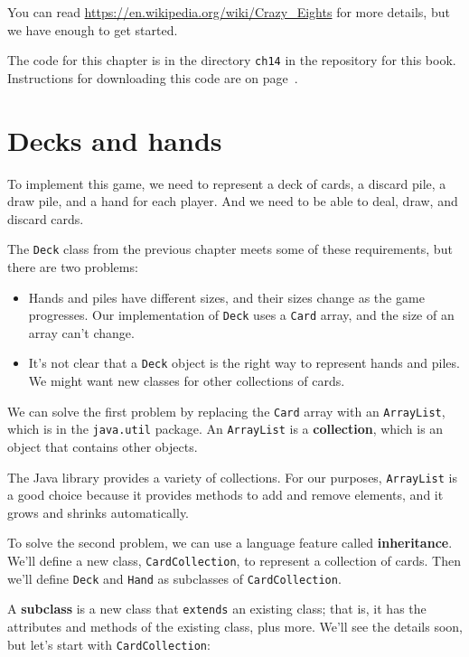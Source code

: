 \documentclass[12pt]{book}
\theoremstyle{exercise}
\newcommand{\java}[1]{\verb"#1"}
\begin{document}
You can read \url{https://en.wikipedia.org/wiki/Crazy_Eights} for more details, but we have enough to get started.

The code for this chapter is in the directory {\tt ch14} in the repository for this book.
Instructions for downloading this code are on page~\pageref{code}.


\section{Decks and hands}

To implement this game, we need to represent a deck of cards, a discard pile, a draw pile, and a hand for each player.
And we need to be able to deal, draw, and discard cards.

The \java{Deck} class from the previous chapter meets some of these requirements, but there are two problems:

\begin{itemize}

\item Hands and piles have different sizes, and their sizes change as the game progresses.
Our implementation of \java{Deck} uses a \java{Card} array, and the size of an array can't change.

\item It's not clear that a \java{Deck} object is the right way to represent hands and piles.
We might want new classes for other collections of cards.

\end{itemize}

We can solve the first problem by replacing the \java{Card} array with an \java{ArrayList}, which is in the \java{java.util} package.
An \java{ArrayList} is a {\bf collection}, which is an object that contains other objects.

The Java library provides a variety of collections.
For our purposes, \java{ArrayList} is a good choice because it provides methods to add and remove elements, and it grows and shrinks automatically.

To solve the second problem, we can use a language feature called {\bf inheritance}.
We'll define a new class, \java{CardCollection}, to represent a collection of cards.
Then we'll define \java{Deck} and \java{Hand} as subclasses of \java{CardCollection}.

A {\bf subclass} is a new class that \java{extends} an existing class; that is, it has the attributes and methods of the existing class, plus more.
We'll see the details soon, but let's start with \java{CardCollection}:
\end{document}
